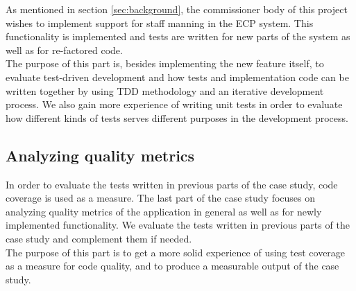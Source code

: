 As mentioned in section \ref{sec:background}, the commissioner body of
this project wishes to implement support for staff manning in the ECP
system. This functionality is implemented and tests are written for
new parts of the system as well as for re-factored code.\\

The purpose of this part is, besides implementing the new feature
itself, to evaluate test-driven development and how tests and
implementation code can be written together by using TDD methodology and
an iterative development process. We also gain more experience of
writing unit tests in order to evaluate how different kinds of tests
serves different purposes in the development process.\\


\subsection{Analyzing quality metrics}
\label{sec:casestudy_3}

In order to evaluate the tests written in previous parts of the case
study, code coverage is used as a measure. The last part of the case
study focuses on analyzing quality metrics of the application in general
as well as for newly implemented functionality. We evaluate the tests
written in previous parts of the case study and complement them if
needed.\\

The purpose of this part is to get a more solid experience of using test
coverage as a measure for code quality, and to produce a measurable
output of the case study.\\

